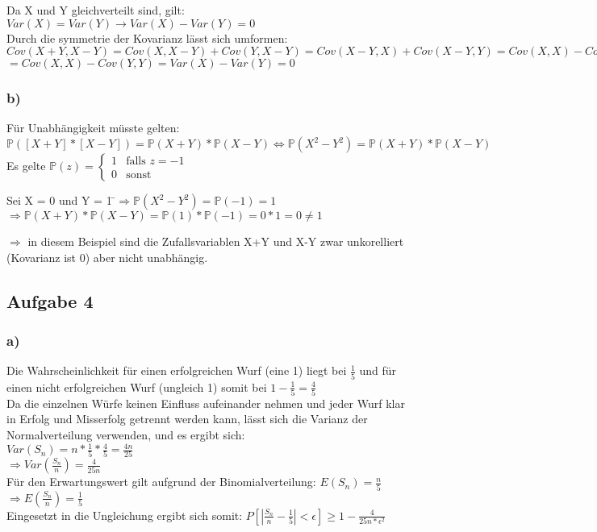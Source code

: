 \documentclass[11pt]{amsart}
\begin{document}
Da X und Y gleichverteilt sind, gilt: $Var(X) = Var(Y) \rightarrow Var(X) - Var(Y) = 0$\\
Durch die symmetrie der Kovarianz lässt sich umformen:\\
$Cov(X+Y, X-Y) = Cov(X,X-Y) + Cov(Y,X-Y) = Cov(X-Y,X) + Cov(X-Y, Y) = Cov(X,X) - Cov(Y,X) + Cov(X,Y) - Cov(Y,Y)$\\
$ = Cov(X,X) - Cov(Y,Y) = Var(X) - Var(Y) = 0$

\subsubsection{b)}

Für Unabhängigkeit müsste gelten: $\mathbb{P}([X+Y]*[X-Y]) = \mathbb{P}(X+Y)*\mathbb{P}(X-Y) \Leftrightarrow \mathbb{P}(X^2 - Y^2) = \mathbb{P}(X+Y)*\mathbb{P}(X-Y)$ \\
Es gelte $\mathbb{P}(z) = \begin{cases} 1 &\mbox{falls } z=-1 \\ 0 &\mbox{sonst} \end{cases}$
\begin{tabbing}
Sei X = 0 und Y = 1 \=$\Rightarrow \mathbb{P}(X^2-Y^2) = \mathbb{P}(-1) = 1$ \\
\> $\Rightarrow \mathbb{P}(X+Y)*\mathbb{P}(X-Y) = \mathbb{P}(1)*\mathbb{P}(-1) = 0*1 = 0 \not = 1$

\end{tabbing}
$\Rightarrow$ in diesem Beispiel sind die Zufallsvariablen X+Y und X-Y zwar unkorelliert (Kovarianz ist 0) aber nicht unabhängig.

\subsection{Aufgabe 4}

\subsubsection{a)}

Die Wahrscheinlichkeit für einen erfolgreichen Wurf (eine 1) liegt bei $\frac{1}{5}$ und für einen 
nicht erfolgreichen Wurf (ungleich 1) somit bei $1 - \frac{1}{5} = \frac{4}{5}$ \\
Da die einzelnen Würfe keinen Einfluss aufeinander nehmen und jeder Wurf klar in Erfolg und Misserfolg 
getrennt werden kann, lässt sich die Varianz der Normalverteilung verwenden, und es ergibt sich: \\
$Var(S_n) = n * \frac{1}{5} * \frac{4}{5} =  \frac{4n}{25}$ \\
$\Rightarrow Var(\frac{S_n}{n}) = \frac{4}{25n}$ \\
Für den Erwartungswert gilt aufgrund der Binomialverteilung: $E(S_n) = \frac{n}{5}$ \\
$\Rightarrow E(\frac{S_n}{n}) = \frac{1}{5}$ \\
Eingesetzt in die Ungleichung ergibt sich somit: $P[|\frac{S_n}{n} - \frac{1}{5}| < \epsilon] \geq 1 - \frac{4}{25n * \epsilon^2}$
\end{document}
